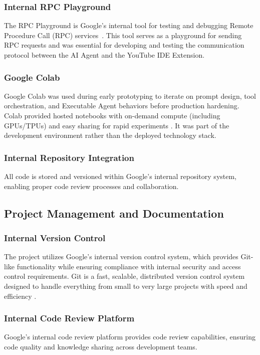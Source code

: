 \begin{spacing}{1.2}
\subsubsection{Internal RPC Playground}
The RPC Playground is Google's internal tool for testing and debugging Remote Procedure Call (RPC) services~\cite{rpc1984}. This tool serves as a playground for sending RPC requests and was essential for developing and testing the communication protocol between the AI Agent and the YouTube IDE Extension.

\subsubsection{Google Colab}
Google Colab was used during early prototyping to iterate on prompt design, tool orchestration, and Executable Agent behaviors before production hardening. Colab provided hosted notebooks with on-demand compute (including GPUs/TPUs) and easy sharing for rapid experiments \cite{colab2017, jupyter2014}. It was part of the development environment rather than the deployed technology stack.


\subsubsection{Internal Repository Integration}
All code is stored and versioned within Google's internal repository system, enabling proper code review processes and collaboration.

\subsection{Project Management and Documentation}

\subsubsection{Internal Version Control}
The project utilizes Google's internal version control system, which provides Git-like functionality while ensuring compliance with internal security and access control requirements. Git is a fast, scalable, distributed version control system designed to handle everything from small to very large projects with speed and efficiency \cite{git2005}.


\subsubsection{Internal Code Review Platform}
Google's internal code review platform provides code review capabilities, ensuring code quality and knowledge sharing across development teams.


\end{spacing}
